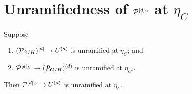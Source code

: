 \documentclass[11pt]{article}
\begin{document}
\section{Unramifiedness of \texorpdfstring{$\mathcal{P}^{[d]_G}$}{P\^{}[d]\_G} at \texorpdfstring{$\eta_C$}{eta\_C}}\label{sec:main}

\begin{theorem}\label{thm:main}
Suppose
\begin{enumerate}
  \item[\textnormal{(H1)}] $(\mathcal{P}_{G/H})^{[d]} \to U^{(d)}$ is unramified at
        $\eta_C$; and
  \item[\textnormal{(H2)}] $\mathcal{P}^{[d]_H} \to (\mathcal{P}_{G/H})^{(d)}$ is unramified at
        $\eta_{C'}$.
\end{enumerate}
Then $\mathcal{P}^{[d]_G} \to U^{(d)}$ is unramified at $\eta_C$.
\end{theorem}
\end{document}
